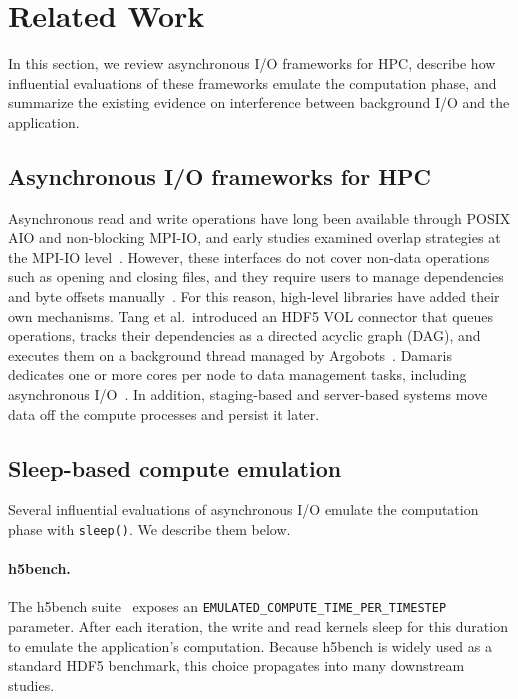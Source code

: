 \section{Related Work}
\label{sec:related}

In this section, we review asynchronous I/O frameworks for HPC, describe how
influential evaluations of these frameworks emulate the computation phase,
and summarize the existing evidence on interference between background I/O
and the application.

\subsection{Asynchronous I/O frameworks for HPC}

Asynchronous read and write operations have long been available through
POSIX AIO and non-blocking MPI-IO, and early studies examined overlap
strategies at the MPI-IO level~\cite{patrick2008overlap}. However, these
interfaces do not cover non-data operations such as opening and closing
files, and they require users to manage dependencies and byte offsets
manually~\cite{tang2022async}. For this reason, high-level libraries have
added their own mechanisms. Tang et al.\ introduced an HDF5 VOL connector
that queues operations, tracks their dependencies as a directed acyclic graph
(DAG), and executes them on a background thread managed by
Argobots~\cite{tang2019async,tang2022async}. Damaris dedicates one or more
cores per node to data management tasks, including asynchronous
I/O~\cite{dorier2016damaris}. In addition, staging-based and server-based
systems move data off the compute processes and persist it later.

\subsection{Sleep-based compute emulation}

Several influential evaluations of asynchronous I/O emulate the computation
phase with \texttt{sleep()}. We describe them below.

\paragraph{h5bench.} The h5bench suite~\cite{li2021h5bench} exposes an
\texttt{EMULATED\_COMPUTE\_TIME\_PER\_TIMESTEP} parameter. After each
iteration, the write and read kernels sleep for this duration to emulate the
application's computation. Because h5bench is widely used as a standard HDF5
benchmark, this choice propagates into many downstream studies.

